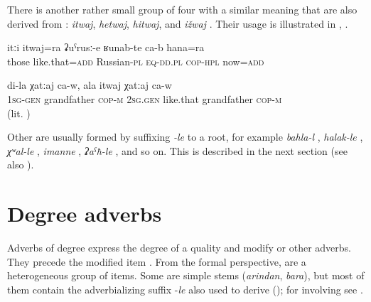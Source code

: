 There is another rather small group of four  with a similar meaning that are also derived from : \textit{itwaj}, \textit{hetwaj}, \textit{hitwaj}, and \textit{ižwaj} . Their usage is illustrated in , .
%
\begin{exe}
		\ex	\label{ex:They are also like this like Russians even now}
		\gll	itːi	itwaj=ra	ʡuˁrusː-e	ʁunab-te	ca-b	hana=ra  \\
			those	like.that=\textsc{add}	Russian-\textsc{pl}	\textsc{eq-dd.pl} 	\textsc{cop-hpl}	now=\textsc{add}\\
		\glt	{}

		\ex	\label{ex:he is my real grandfather}
		\gll	di-la	χatːaj	ca-w,	ala	itwaj	χatːaj	ca-w   \\
			1\textsc{sg}-\textsc{gen}	grandfather	\textsc{cop-m}	2\textsc{sg}.\textsc{gen}	like.that grandfather	\textsc{cop-m}\\
		\glt	{} (lit. )
\end{exe}

Other  are usually formed by suffixing \textit{-le} to a root, for example \textit{bahla-l} , \textit{halak-le} , \textit{χʷal-le} , \textit{imanne} , \textit{ʡaˁħ-le} , and so on. This is described in the next section (see also ).



\section{Degree adverbs}
\label{sec:Degree adverbs}

Adverbs of degree express the degree of a quality and modify  or other adverbs. They precede the modified item . From the formal perspective,  are a heterogeneous group of items. Some are simple stems (\textit{arindan}, \textit{bara}), but most of them contain the adverbializing suffix -\textit{le} also used to derive   (); for  involving  see . 

